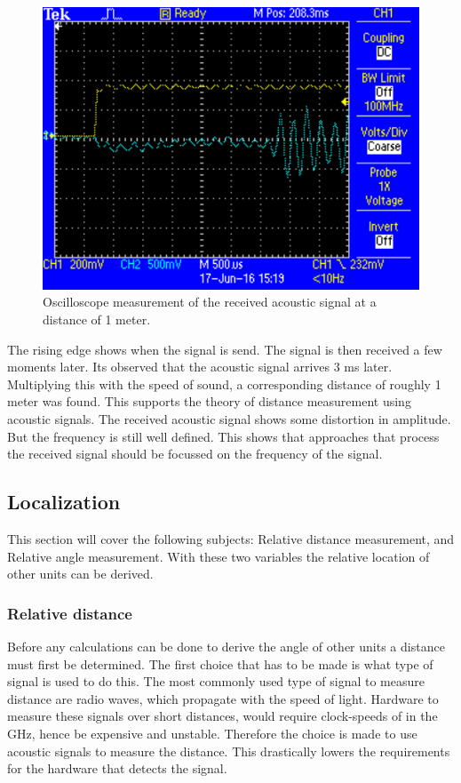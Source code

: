 \documentclass[10pt,a4paper]{article}
\begin{document}
\begin{figure}[H]
\centering
\includegraphics[width=1\textwidth]{1metersignal.pdf}
\caption{Oscilloscope measurement of the received acoustic signal at a distance of 1 meter.}
\label{1metersignal}
\end{figure}

The rising edge shows when the signal is send. The signal is then received a few moments later. Its observed that the acoustic signal arrives 3 ms later. Multiplying this with the speed of sound, a corresponding distance of roughly 1 meter was found. This supports the theory of distance measurement using acoustic signals. The received acoustic signal shows some distortion in amplitude. But the frequency is still well defined. This shows that approaches that process the received signal should be focussed on the frequency of the signal.


\subsection{Localization}
This section will cover the following subjects: Relative distance measurement, and Relative angle measurement. With these two variables the relative location of other units can be derived. 

\subsubsection{Relative distance}
Before any calculations can be done to derive the angle of other units a distance must first be determined. The first choice that has to be made is what type of signal is used to do this. The most commonly used type of signal to measure distance are radio waves, which propagate with the speed of light. Hardware to measure these  signals over short distances, would require clock-speeds of in the GHz, hence be expensive and unstable. Therefore the choice is made to use acoustic signals to measure the distance. This drastically lowers the requirements for the hardware that detects the signal.
\end{document}
